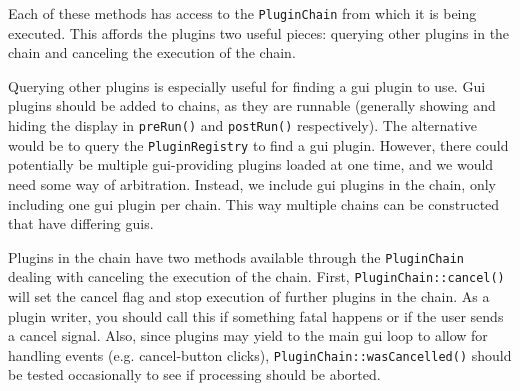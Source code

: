 Each of these methods has access to the {\tt PluginChain} from 
which it is being executed. This affords the plugins two useful
pieces: querying other plugins in the chain and canceling 
the execution of the chain. 

Querying other plugins is especially useful for finding a gui
plugin to use. Gui plugins should be added to chains, as
they are runnable (generally showing and hiding the display in 
{\tt preRun()} and {\tt postRun()} respectively). The alternative
would be to query the {\tt PluginRegistry} to find a gui plugin.
However, there could potentially be multiple gui-providing plugins
loaded at one time, and we would need some way of arbitration. 
Instead, we include gui plugins in the chain, only including one
gui plugin per chain. This way multiple chains can be constructed
that have differing guis.

Plugins in the chain have two methods available through the 
{\tt PluginChain} dealing with canceling the execution of the
chain. First, {\tt PluginChain::cancel()} will set the cancel
flag and stop execution of further plugins in the chain. As 
a plugin writer, you should call this if something fatal happens
or if the user sends a cancel signal. Also, since plugins may 
yield to the main gui loop to allow for handling events (e.g. 
cancel-button clicks), {\tt PluginChain::wasCancelled()} should
be tested occasionally to see if processing should be aborted.


